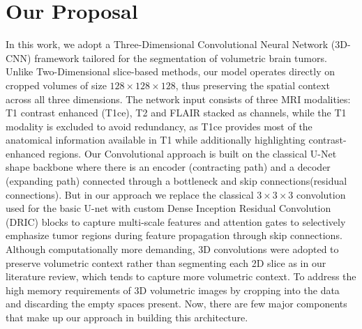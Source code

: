 
\section{Our Proposal}

In this work, we adopt a Three-Dimensional Convolutional Neural Network (3D-CNN) framework tailored for the segmentation of volumetric brain tumors. Unlike Two-Dimensional slice-based methods, our model operates directly on cropped volumes of size $128\times128\times128$, thus preserving the spatial context across all three dimensions. The network input consists of three MRI modalities: T1 contrast enhanced (T1ce), T2 and FLAIR stacked as channels, while the T1 modality is excluded to avoid redundancy, as T1ce provides most of the anatomical information available in T1 while additionally highlighting contrast-enhanced regions. Our Convolutional approach is built on the classical U-Net shape backbone where there is an encoder (contracting path) and a decoder (expanding path) connected through a bottleneck and skip connections(residual connections). But in our approach we replace the classical $3\times3\times3$ convolution used for the basic U-net with custom Dense Inception Residual Convolution (DRIC) blocks to capture multi-scale features and attention gates to selectively emphasize tumor regions during feature propagation through skip connections. Although computationally more demanding, 3D convolutions were adopted to preserve volumetric context rather than segmenting each 2D slice as in our literature review, which tends to capture more volumetric context. To address the high memory requirements of 3D volumetric images by cropping into the data and discarding the empty spaces present. Now, there are few major components that make up our approach in building this architecture.
